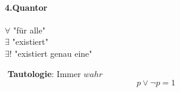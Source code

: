\paragraph{4.Quantor}
\begin{center}
$\forall$ "für alle"\\
$\exists$ "existiert"\\
$\exists !$ "existiert genau eine"
\end{center}

\newpage

\begin{remark}
$ $\newline
\textbf{Tautologie}: Immer $wahr$\\
\begin{equation*}
p\vee\neg p=1
\end{equation*}
\null
\end{remark}
